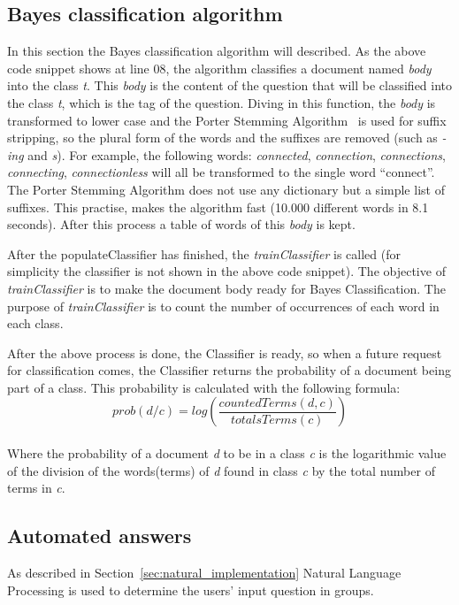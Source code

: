 \subsection{Bayes classification algorithm}
In this section the Bayes classification algorithm will described. As the above code snippet shows at line 08, the algorithm classifies a document named \emph{body} into the class \emph{t}. This \emph{body} is the content of the question that will be classified into the class \emph{t}, which is the tag of the question. Diving in this function, the \emph{body} is transformed to lower case and the Porter Stemming Algorithm~\citep{porter1980algorithm} is used for suffix stripping, so the plural form of the words and the suffixes are removed (such as \emph{-ing} and \emph{s}). For example, the following words: {\it connected}, {\it connection}, {\it connections}, {\it connecting}, {\it connectionless} will all be transformed to the single word ``connect''. The Porter Stemming Algorithm does not use any dictionary but a simple list of suffixes. This practise, makes the algorithm fast (10.000 different words in 8.1 seconds). After this process a table of words of this \emph{body} is kept.

After the populateClassifier has finished, the \emph{trainClassifier} is called (for simplicity the classifier is not shown in the above code snippet). The objective of \emph{trainClassifier} is to make the document body ready for Bayes Classification. The purpose of \emph{trainClassifier} is to count the number of occurrences of each word in each class.

After the above process is done, the Classifier is ready, so when a future request for classification comes, the Classifier returns the probability of a document being part of a class. This probability is calculated with the following formula:
\\
\[prob(d / c) = log\left ( \frac{countedTerms(d, c)}{totalsTerms(c)} \right )\]
\\
Where the probability of a document {\it d} to be in a class {\it c} is the logarithmic value of the division of the words(terms) of {\it d} found in class {\it c} by the total number of terms in {\it c}.

\subsection{Automated answers}
\label{sec:example_nlp}
As described in Section~\ref{sec:natural_implementation} Natural Language Processing is used to determine the users' input question in groups. 


